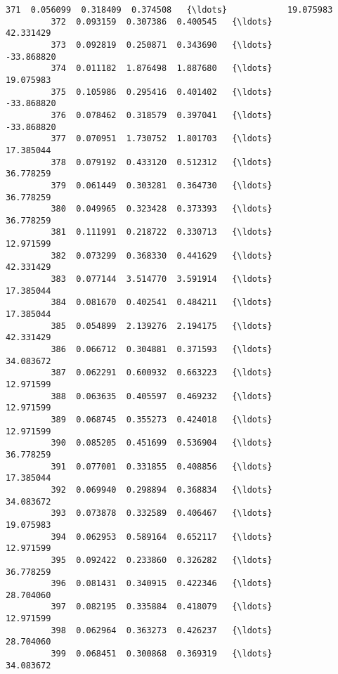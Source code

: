 \documentclass[11pt]{article}
\begin{document}
\begin{Verbatim}[commandchars=\\\{\}]
         371  0.056099  0.318409  0.374508   {\ldots}            19.075983   
         372  0.093159  0.307386  0.400545   {\ldots}            42.331429   
         373  0.092819  0.250871  0.343690   {\ldots}           -33.868820   
         374  0.011182  1.876498  1.887680   {\ldots}            19.075983   
         375  0.105986  0.295416  0.401402   {\ldots}           -33.868820   
         376  0.078462  0.318579  0.397041   {\ldots}           -33.868820   
         377  0.070951  1.730752  1.801703   {\ldots}            17.385044   
         378  0.079192  0.433120  0.512312   {\ldots}            36.778259   
         379  0.061449  0.303281  0.364730   {\ldots}            36.778259   
         380  0.049965  0.323428  0.373393   {\ldots}            36.778259   
         381  0.111991  0.218722  0.330713   {\ldots}            12.971599   
         382  0.073299  0.368330  0.441629   {\ldots}            42.331429   
         383  0.077144  3.514770  3.591914   {\ldots}            17.385044   
         384  0.081670  0.402541  0.484211   {\ldots}            17.385044   
         385  0.054899  2.139276  2.194175   {\ldots}            42.331429   
         386  0.066712  0.304881  0.371593   {\ldots}            34.083672   
         387  0.062291  0.600932  0.663223   {\ldots}            12.971599   
         388  0.063635  0.405597  0.469232   {\ldots}            12.971599   
         389  0.068745  0.355273  0.424018   {\ldots}            12.971599   
         390  0.085205  0.451699  0.536904   {\ldots}            36.778259   
         391  0.077001  0.331855  0.408856   {\ldots}            17.385044   
         392  0.069940  0.298894  0.368834   {\ldots}            34.083672   
         393  0.073878  0.332589  0.406467   {\ldots}            19.075983   
         394  0.062953  0.589164  0.652117   {\ldots}            12.971599   
         395  0.092422  0.233860  0.326282   {\ldots}            36.778259   
         396  0.081431  0.340915  0.422346   {\ldots}            28.704060   
         397  0.082195  0.335884  0.418079   {\ldots}            12.971599   
         398  0.062964  0.363273  0.426237   {\ldots}            28.704060   
         399  0.068451  0.300868  0.369319   {\ldots}            34.083672   
         

\end{Verbatim}
\end{document}
